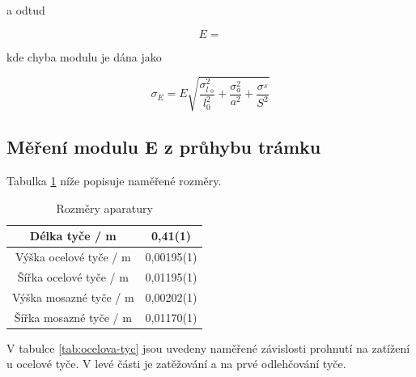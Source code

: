 a odtud

\begin{equation}
    \nonumber
    E = 
\end{equation}

kde chyba modulu je dána jako

\begin{equation}
    \sigma_E = E \sqrt{\frac{\sigma^2_l__0}{l^2_0}+\frac{\sigma^2_a}{a^2}+\frac{\sigma^_S}{S^2}}
\end{equation}

\subsection{Měření modulu E z průhybu trámku}

Tabulka \ref{tab:rozmery-aparatury} níže popisuje naměřené rozměry.

\begin{table}[h]
\centering
\begin{tabular}{|c|c|}
\hline
Délka tyče / m         & 0,41(1)    \\ \hline
Výška ocelové tyče / m & 0,00195(1) \\ \hline
Šířka ocelové tyče / m & 0,01195(1) \\ \hline
Výška mosazné tyče / m & 0,00202(1) \\ \hline
Šířka mosazné tyče / m & 0,01170(1)  \\ \hline
\end{tabular}
\caption{Rozměry aparatury}
\label{tab:rozmery-aparatury}
\end{table}

V tabulce \ref{tab:ocelova-tyc} jsou uvedeny naměřené závislosti prohnutí na zatížení u ocelové tyče. V levé části je zatěžování a na prvé odlehčování tyče.

